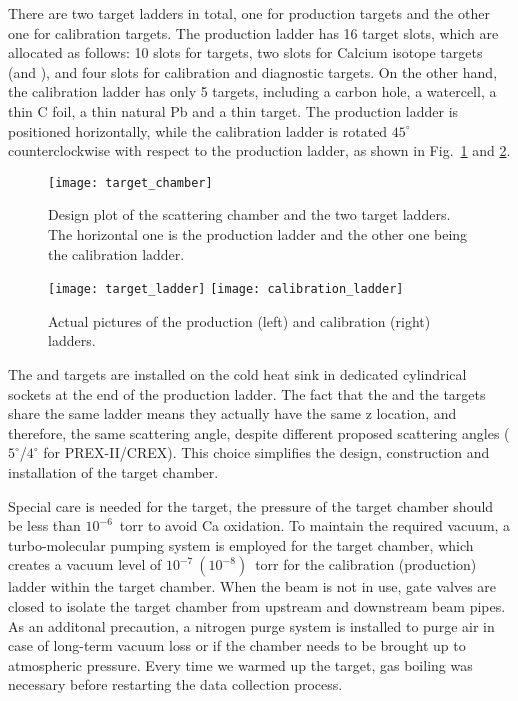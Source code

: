 There are two target ladders in total, one for production targets and the other
one for calibration targets. The production ladder has 16 target slots, which
are allocated as follows: 10 slots for \Pb targets, two slots for Calcium isotope targets (\ca and \Ca),
and four slots for calibration and diagnostic targets.  
On the other hand, the calibration ladder has only 5 targets, including a carbon hole, 
a watercell, a thin C foil, a thin natural Pb and a thin \ca target.
The production ladder is positioned horizontally, while the calibration ladder is rotated 
$45^\circ$ counterclockwise with respect to the production ladder, 
as shown in Fig.~\ref{fig:scattering_chamber} and \ref{fig:target_ladder}.

\begin{figure}[!h]
    \centering
    \texttt{[image: target\_chamber]}
    \caption[Scattering chamber]
    {Design plot of the scattering chamber and the two target ladders.
    The horizontal one is the production ladder and the other one being the 
    calibration ladder.}
    \label{fig:scattering_chamber}
\end{figure}
\begin{figure}[!h]
    \centering
    \texttt{[image: target\_ladder]}
    \texttt{[image: calibration\_ladder]}
    \caption{Actual pictures of the production (left) and calibration (right) ladders.}
    \label{fig:target_ladder}
\end{figure}

The \ca and \Ca targets are installed on the cold heat sink in dedicated cylindrical 
sockets at the end of the production ladder. %
The fact that the \Ca and the \Pb targets share the same ladder means they 
actually have the same z location, and therefore, the same scattering angle,
despite different proposed scattering angles ($5^\circ$/$4^\circ$ for PREX-II/CREX).
This choice simplifies the design, construction and installation of the target chamber.

Special care is needed for the \Ca target, the pressure of the target chamber 
should be less than $10^{-6}$~torr to avoid Ca oxidation. 
To maintain the required vacuum, a turbo-molecular pumping system is employed
for the target chamber, which creates a vacuum level of  $10^{-7}\ (10^{-8})$~torr 
for the calibration (production) ladder within the target chamber. When the beam is
not in use, gate valves are closed to isolate the target chamber from upstream and 
downstream beam pipes. As an additonal precaution, a nitrogen purge system is 
installed to purge air in case of long-term vacuum loss or if the chamber needs
to be brought up to atmospheric pressure.
Every time we warmed up the \Ca target, gas boiling was necessary before restarting 
the data collection process.

